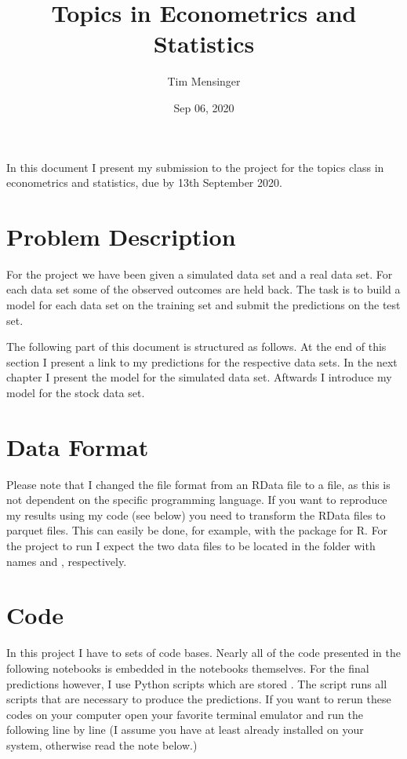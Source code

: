 \documentclass[letterpaper,10pt,english]{sphinxmanual}
\title{Topics in Econometrics and Statistics}
\date{Sep 06, 2020}
\author{Tim Mensinger}
\begin{document}
\pagestyle{empty}
\sphinxmaketitle
\pagestyle{plain}
\sphinxtableofcontents
\pagestyle{normal}
\label{\detokenize{intro::doc}}



In this document I present my submission to the project for the topics class in
econometrics and statistics, due by 13th September 2020.


\chapter{Problem Description}
\label{\detokenize{intro:problem-description}}
For the project we have been given a simulated data set and a real data set. For each
data set some of the observed outcomes are held back. The task is to build a model for
each data set on the training set and submit the predictions on the test set.

The following part of this document is structured as follows. At the end of this
section I present a link to my predictions for the respective data sets. In the next
chapter I present the model for the simulated data set. Aftwards I introduce my model
for the stock data set.


\chapter{Data Format}
\label{\detokenize{intro:data-format}}
Please note that I changed the file format from an RData file to a  file, as this is not dependent on the specific programming language. If you want to reproduce my results using my code (see below) you need to transform the RData files to parquet files. This can easily be done, for example, with the  package for R. For the project to run I expect the two data files to be located in the folder  with names  and , respectively.


\chapter{Code}
\label{\detokenize{intro:code}}
In this project I have to sets of code bases. Nearly all of the code presented in the following notebooks is embedded in the notebooks themselves. For the final predictions however, I use Python scripts which are stored . The script  runs all scripts that are necessary to produce the predictions. If you want to rerun these codes on your computer open your favorite terminal emulator and run the following line by line (I assume you have at least  already installed on your system, otherwise read the note below.)
\end{document}
